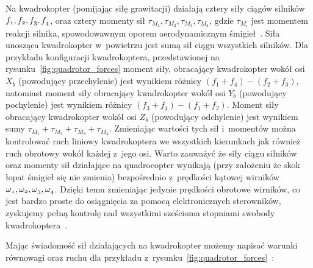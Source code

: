 \documentclass[11pt, twoside]{Thesis} %
\begin{document}
Na kwadrokopter (pomijając siłę grawitacji) działają cztery siły ciągów silników $\mathnormal{f_1, f_2, f_3, f_4}$, oraz cztery momenty sił $\tau_{M_1}, \tau_{M_2}, \tau_{M_3}, \tau_{M_4}$, gdzie $\tau_{M_i}$ jest momentem reakcji silnika, spowodowawnym oporem aerodynamicznym śmigieł~\cite{quadro8, quadro9}. 
Siła unosząca kwadrokopter w~powietrzu jest sumą sił ciągu wszystkich silników. Dla przykładu konfiguracji kwadrokoptera, przedstawionej na rysunku~\ref{fig:quadrotor_forces} moment siły, obracający kwadrokopter wokół osi $X_b$ (powodujący przechylenie) jest wynikiem różnicy $(f_1 + f_4) - (f_2 + f_3)$, natomiast moment siły obracający kwadrokopter wokół osi $Y_b$ (powodujący pochylenie) jest wynikiem różnicy $(f_3 + f_4) - (f_1 + f_2)$. 
Moment siły obracający kwadrokopter wokół osi $Z_b$ (powodujący odchylenie) jest wynikiem sumy $\tau_{M_1} + \tau_{M_2} + \tau_{M_3} + \tau_{M_4}$.  Zmieniając wartości tych sił i~momentów można kontrolować ruch liniowy kwadrokoptera we wszystkich kierunkach jak również ruch obrotowy wokół każdej z~jego osi. Warto zauważyć że siły ciągu silników oraz momenty sił działające na quadrocopter wynikają (przy założeniu że skok łopat śmigieł się nie zmienia) bezpośrednio z~prędkości kątowej wirników $\mathnormal{\omega_1, \omega_2, \omega_3, \omega_4}$. Dzięki temu zmieniając jedynie prędkości obrotowe wirników, co jest bardzo proste do osiągnięcia za pomocą elektronicznych sterowników, zyskujemy pełną kontrolę nad wszystkimi sześcioma stopniami swobody kwadrokoptera~\cite{quadro8}.  

Mając świadomość sił działających na kwadrokopter możemy napisać warunki równowagi oraz ruchu dla przykładu z~rysunku~\ref{fig:quadrotor_forces}~\cite{quadro8, quadro9}:
\end{document}
